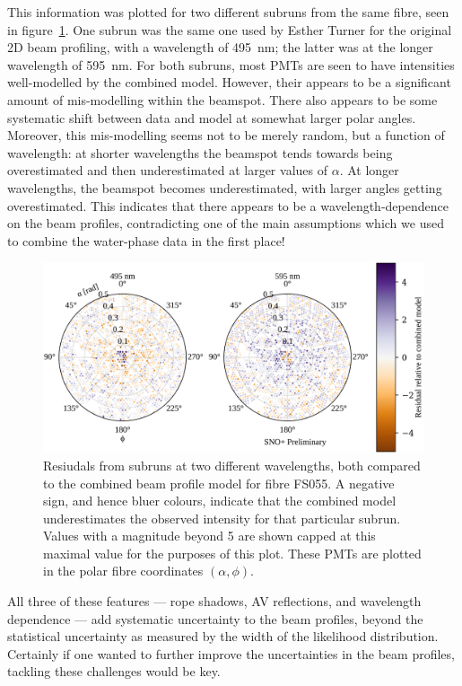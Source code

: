This information was plotted for two different subruns from the same fibre, seen in figure~\ref{fig:llr}. One subrun was the same one used by Esther Turner for the original 2D beam profiling, with a wavelength of \SI{495}{\nano\metre}; the latter was at the longer wavelength of \SI{595}{\nano\metre}. For both subruns, most PMTs are seen to have intensities well-modelled by the combined model. However, their appears to be a significant amount of mis-modelling within the beamspot. There also appears to be some systematic shift between data and model at somewhat larger polar angles. Moreover, this mis-modelling seems not to be merely random, but a function of wavelength: at shorter wavelengths the beamspot tends towards being overestimated and then underestimated at larger values of $\alpha$. At longer wavelengths, the beamspot becomes underestimated, with larger angles getting overestimated. This indicates that there appears to be a wavelength-dependence on the beam profiles, contradicting one of the main assumptions which we used to combine the water-phase data in the first place!
\begin{figure}
    \centering
    \includegraphics[width=\textwidth]{5_SMELLIESimulation/images/residual_wavelength_comparison_data_model_nice.pdf}
    \caption{Resiudals from subruns at two different wavelengths, both compared to the combined beam profile model for fibre FS055. A negative sign, and hence bluer colours, indicate that the combined model underestimates the observed intensity for that particular subrun. Values with a magnitude beyond 5 are shown capped at this maximal value for the purposes of this plot. These PMTs are plotted in the polar fibre coordinates $(\alpha,\phi)$.}
    \label{fig:llr}
\end{figure}
All three of these features --- rope shadows, AV reflections, and wavelength dependence --- add systematic uncertainty to the beam profiles, beyond the statistical uncertainty as measured by the width of the likelihood distribution. Certainly if one wanted to further improve the uncertainties in the beam profiles, tackling these challenges would be key.